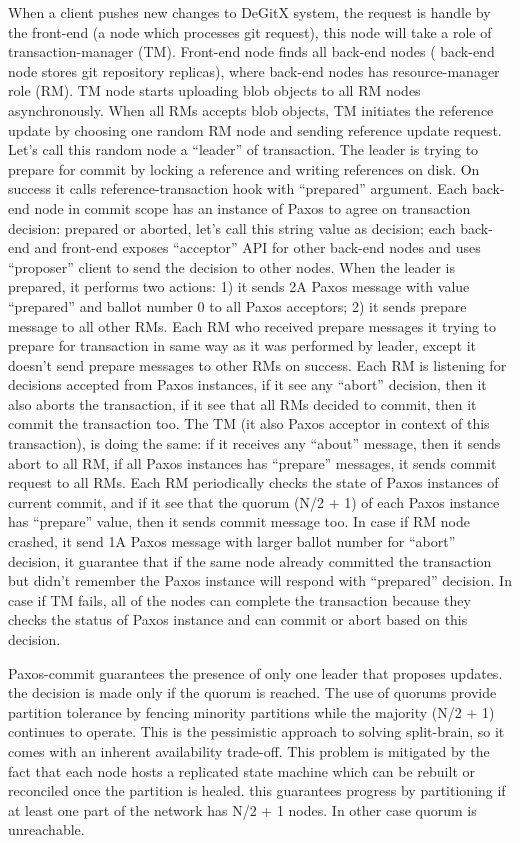 \documentclass[sigplan, screen, nonacm, 11pt]{acmart}
\begin{document}
When a client pushes new changes to DeGitX system, the request is handle by the front-end (a node which processes
git request), this node will take a role of transaction-manager (TM). Front-end node finds all back-end nodes (
back-end node stores git repository replicas), where back-end nodes has resource-manager role (RM).
TM node starts uploading blob objects to all RM nodes asynchronously. When all RMs accepts blob objects,
TM initiates the reference update by choosing one random RM node and sending reference update request.
Let's call this random node a ``leader'' of transaction. The leader is trying to prepare for commit by
locking a reference and writing references on disk. On success it calls reference-transaction hook with ``prepared''
argument. Each back-end node in commit scope has an instance of Paxos to agree on transaction decision: prepared or aborted,
let's call this string value as decision;
each back-end and front-end exposes ``acceptor'' API for other back-end nodes and uses ``proposer'' client to send
the decision to other nodes. When the leader is prepared, it performs two actions: 1) it sends 2A Paxos message with value
``prepared'' and ballot number 0 to all Paxos acceptors; 2) it sends prepare message to all other RMs.
Each RM who received prepare messages it trying to prepare for transaction in same way as it was performed by leader,
except it doesn't send prepare messages to other RMs on success. Each RM is listening for decisions accepted from Paxos
instances, if it see any ``abort'' decision, then it also aborts the transaction, if it see that all RMs decided to commit,
then it commit the transaction too. The TM (it also Paxos acceptor in context of this transaction), is doing the same:
if it receives any ``about'' message, then it sends abort to all RM, if all Paxos instances has ``prepare'' messages,
it sends commit request to all RMs. Each RM periodically checks the state of Paxos instances of current commit, and if it see
that the quorum (N/2 + 1) of each Paxos instance has ``prepare'' value, then it sends commit message too.
In case if RM node crashed, it send 1A Paxos message with larger ballot number for ``abort'' decision, it guarantee
that if the same node already committed the transaction but didn't remember the Paxos instance will respond with
``prepared'' decision. In case if TM fails, all of the nodes can complete the transaction because they checks the status
of Paxos instance and can commit or abort based on this decision.

Paxos-commit guarantees the presence of only one leader that proposes updates.
the decision is made only if the quorum is reached.
The use of quorums provide partition tolerance by fencing minority partitions while the majority (N/2 + 1) continues to operate.
This is the pessimistic approach to solving split-brain,
so it comes with an inherent availability trade-off.
This problem is mitigated by the fact that each node hosts a replicated state machine which can be rebuilt or reconciled once the partition is healed.
this guarantees progress by partitioning if at least one part of the network has N/2 + 1 nodes. In other case quorum is unreachable.
\end{document}
